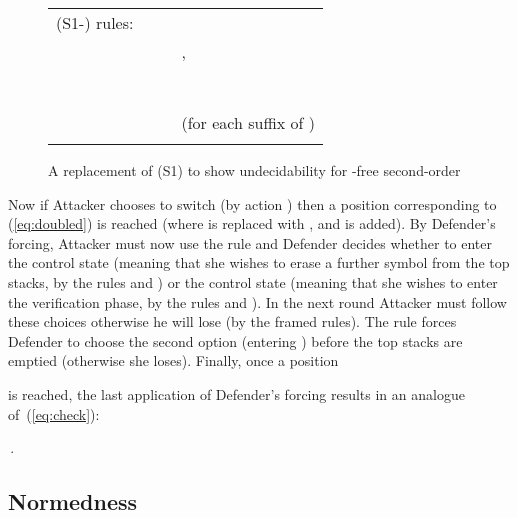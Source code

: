 \documentclass[11pt]{article}
\newcommand{\pda}{\text{PDA}\xspace}
\begin{document}
\begin{figure}[ht]


\begin{tabular}{llll}
\vspace{1mm}
(S1-) rules:  &  
 & & \\ 
&  &  & 
, 
\\
\vspace{1mm}
& \fbox{, }
\\ 
&  &&  \\
\vspace{1mm}
& && \fbox{} \\  
&  &&  \\
& && \fbox{} \\ 
\vspace{1mm}
&  \\   
& \\
& \fbox{} 
& &  \hspace{3mm}
 (for each suffix  of )\\ \\
\end{tabular}
\caption{A replacement of (S1) to show undecidability
for -free second-order \pda}\label{fig:modifrules}
\end{figure}
\noindent
Now if Attacker chooses to switch (by action ) then
a position corresponding to (\ref{eq:doubled}) is reached
(where  is replaced with , and  is added).
By Defender's forcing, Attacker must now use
the rule  and Defender decides whether
to enter the control state  (meaning that she wishes to erase
a further symbol  
from the top stacks, by the rules 
and ) or the control state  (meaning
that she wishes to enter the verification phase,
by the rules  
and ). In the next
round Attacker must follow these choices otherwise he will lose
(by the framed rules). 
The rule  forces 
Defender to choose the second option (entering ) 
before the top stacks are emptied (otherwise she loses).
Finally, once a position 
\begin{center}

\end{center}
is reached,
the last application of Defender's forcing
results in an analogue of~(\ref{eq:check}):
\begin{center}
\,.
\end{center}


\subsection{Normedness}
\end{document}
